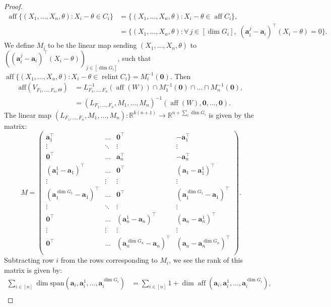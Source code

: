 \documentclass[10pt]{article}
\theoremstyle{definition}
\theoremstyle{remark}
\newcommand{\R}{\mathbb{R}}
\newcommand{\T}{\intercal}
\newcommand{\CType}{F_1,\dots,F_n}
\newcommand{\sample}{ X_1,\dots, X_n}
\DeclareMathOperator{\relint}{relint}
\DeclareMathOperator{\aff}{aff}
\renewcommand{\vec}[1]{\mathbf{#1}}
\begin{document}
\begin{proof}
		\begin{align*}
			\aff \{ (\sample,\theta) : X_i - \theta \in C_i \} &= \{ (\sample,\theta) : X_i - \theta \in \aff C_i \}, \\
			&= \{ (\sample,\theta) : \forall \, j \in [\dim G_i], 
			\; (\vec a_i^j - \vec a_i)^{\T}(X_i - \theta) = 0 \}.
		\end{align*}
		We define $M_i$ to be the linear map sending $(\sample,\theta)$ to $\left((\vec a_i^{j}-\vec a_i)^{\T}(X_i-\theta)\right)_{j \in [\dim G_i]}$, such that $\aff \{ (\sample,\theta) : X_i - \theta \in \relint C_i \} = M_i^{-1}(\vec 0)$. Then 
		\begin{align*}
			\text{aff}(V_{\CType,\Theta}) &= L_{\CType}^{-1}(\aff(W)) \cap M_1^{-1}(\vec 0) \cap \dots \cap M_n^{-1}(\vec 0), \\
			&= (L_{\CType},M_1,\dots,M_n)^{-1}(\aff(W),\vec 0,\dots,\vec 0).
		\end{align*}
		The linear map $(L_{\CType},M_1,\dots,M_n) : \R^{k(n+1)} \rightarrow \R^{n + \sum_i \dim G_i}$ is given by the matrix:
		$$
		M = \begin{pmatrix}
			\vec a_1^{\T} & \dots & \vec 0^\T & -\vec a_1^{\T} \\
			\vdots & \ddots & \vdots & \vdots \\
			\vec 0^\T & \hdots & \vec a_n^{\T} & -\vec a_n^{\T} \\
			(\vec a_1^1 - \vec a_1)^{\T}& \hdots & \vec 0^\T & (\vec a_1 - \vec a_1^1)^{\T} \\
			\vdots & \vdots & \vdots & \vdots \\
			(\vec a_1^{\dim G_1}- \vec a_1)^\T& \hdots & \vec 0^\T & (\vec a_1^{\dim G_1} - \vec a_1)^\T \\
			\vdots & \ddots & \vdots & \vdots \\
			\vec 0^\T & \hdots & (\vec a_n^1 - \vec a_n)^\T & (\vec a_n - \vec a_n^1)^{\T} \\
			\vdots & \vdots & \vdots & \vdots \\
			\vec 0^\T & \hdots & (\vec a_n^{\dim G_n} - \vec a_n)^{\T} & (\vec a_n - \vec a_n^{\dim G_n})^{\T} \\
		\end{pmatrix}.
		$$
		Subtracting row $i$ from the rows corresponding to $M_i$, we see the rank of this matrix is given by:
		\begin{align*}
			\textstyle \sum_{i \in [n]} \dim \text{span} (\vec a_i, \vec a_i^1, \dots, \vec a_i^{\dim G_i}) &= \textstyle \sum_{i \in [n]} 1+ \dim \aff (\vec a_i, \vec a_i^1, \dots, \vec a_i^{\dim G_i}), \\

\end{align*}
\end{proof}
\end{document}
